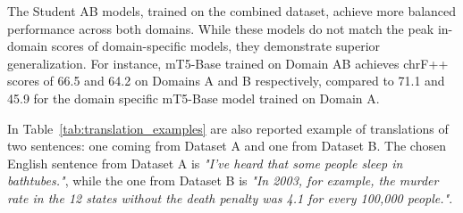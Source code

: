 \documentclass[pdflatex,sn-mathphys-num]{sn-jnl}%
\theoremstyle{thmstyleone}%
\theoremstyle{thmstyletwo}%
\theoremstyle{thmstylethree}%
\begin{document}
The Student AB models, trained on the combined dataset, achieve more balanced performance across both domains. While these models do not match the peak in-domain scores of domain-specific models, they demonstrate superior generalization. For instance, mT5-Base trained on Domain AB achieves chrF++ scores of 66.5 and 64.2 on Domains A and B respectively, compared to 71.1 and 45.9 for the domain specific mT5-Base model trained on Domain A.

In Table~\ref{tab:translation_examples} are also reported example of translations of two sentences: one coming from Dataset A and one from Dataset B. The chosen English sentence from Dataset A is \textit{"I've heard that some people sleep in bathtubes."}, while the one from Dataset B is \textit{"In 2003, for example, the murder rate in the 12 states without the death penalty was 4.1 for every 100,000 people."}.
\end{document}
